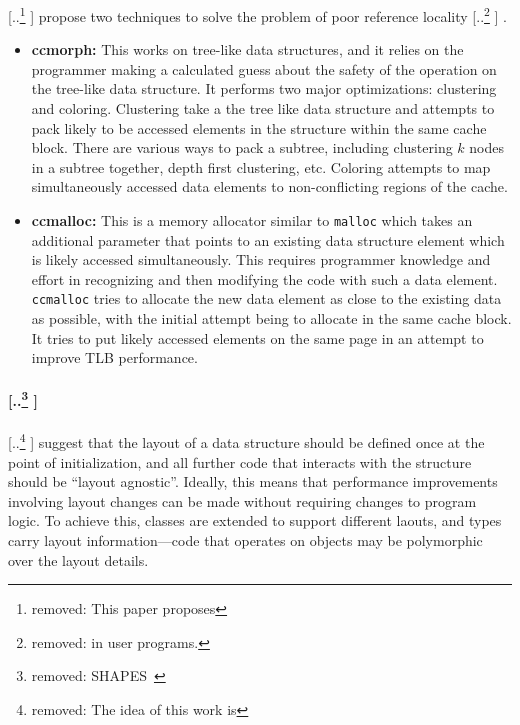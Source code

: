 \documentclass[acmsmall,review,anonymous]{acmart}\settopmatter{printfolios=true,printccs=false,printacmref=false}
\providecommand{\DIFaddtex}[1]{{\protect\color{blue} \sf #1}} %
\providecommand{\DIFdeltex}[1]{{\protect\color{red} [..\footnote{removed: #1} ]}} %
\providecommand{\DIFaddbegin}{} %
\providecommand{\DIFaddend}{} %
\providecommand{\DIFdelbegin}{} %
\providecommand{\DIFdelend}{} %
\providecommand{\DIFadd}[1]{\texorpdfstring{\DIFaddtex{#1}}{#1}} %
\providecommand{\DIFdel}[1]{\texorpdfstring{\DIFdeltex{#1}}{}} %
\newcommand{\DIFscaledelfig}{0.5}
\newlength{\DIFdelgraphicswidth} %
\newlength{\DIFdelgraphicsheight} %
\newcommand{\DIFaddincludegraphics}[2][]{{\color{blue}\fbox{\DIFOincludegraphics[#1]{#2}}}} %
\newcommand{\DIFdelincludegraphics}[2][]{%
\sbox{\DIFdelgraphicsbox}{\DIFOincludegraphics[#1]{#2}}%
\settoboxwidth{\DIFdelgraphicswidth}{\DIFdelgraphicsbox} %
\settoboxtotalheight{\DIFdelgraphicsheight}{\DIFdelgraphicsbox} %
\scalebox{\DIFscaledelfig}{%
\parbox[b]{\DIFdelgraphicswidth}{\usebox{\DIFdelgraphicsbox}\\[-\baselineskip] \rule{\DIFdelgraphicswidth}{0em}}\llap{\resizebox{\DIFdelgraphicswidth}{\DIFdelgraphicsheight}{%
\setlength{\unitlength}{\DIFdelgraphicswidth}%
\begin{picture}(1,1)%
\thicklines\linethickness{2pt} %
{\color[rgb]{1,0,0}\put(0,0){\framebox(1,1){}}}%
{\color[rgb]{1,0,0}\put(0,0){\line( 1,1){1}}}%
{\color[rgb]{1,0,0}\put(0,1){\line(1,-1){1}}}%
\end{picture}%
}\hspace*{3pt}}} %
} %
\DeclareRobustCommand{\DIFaddbegin}{\DIFOaddbegin \let\includegraphics\DIFaddincludegraphics} %
\DeclareRobustCommand{\DIFaddend}{\DIFOaddend \let\includegraphics\DIFOincludegraphics} %
\DeclareRobustCommand{\DIFdelbegin}{\DIFOdelbegin \let\includegraphics\DIFdelincludegraphics} %
\DeclareRobustCommand{\DIFdelend}{\DIFOaddend \let\includegraphics\DIFOincludegraphics} %
\begin{document}
\DIFdel{This paper proposes }\DIFdelend \DIFaddbegin \DIFadd{\citet{CSL} propose }\DIFaddend two techniques to solve the problem of poor reference locality\DIFdelbegin \DIFdel{in user programs.
}%
\DIFdelend \DIFaddbegin \DIFadd{.
}\begin{itemize}[leftmargin=*]
\DIFaddend \item \textbf{ccmorph:} This works on tree-like data structures, and it relies on the programmer making a calculated guess about the safety of the operation on the tree-like data structure. It performs two major optimizations: clustering and coloring. Clustering take a the tree like data structure and attempts to pack likely to be accessed elements in the structure within the same cache block. There are various ways to pack a subtree, including clustering $k$ nodes in a subtree together, depth first clustering, etc.
Coloring attempts to map simultaneously accessed data elements to non-conflicting regions of the cache.
\item \textbf{ccmalloc:} This is a memory allocator similar to \texttt{malloc} which takes an additional parameter that points to an existing data structure element which is likely accessed simultaneously. This requires programmer knowledge and effort in recognizing and then modifying the code with such a data element. \texttt{ccmalloc} tries to allocate the new data element as close to the existing data as possible, with the initial attempt being to allocate in the same cache block. It tries to put likely accessed elements on the same page in an attempt to improve TLB performance.
\end{itemize}


\DIFdelbegin \paragraph{\DIFdel{SHAPES~\cite{Shapes, Shapes2}}} %
\addtocounter{paragraph}{-1}%
\DIFdel{The idea of this work is }\DIFdelend \DIFaddbegin \DIFadd{\citet{Shapes, Shapes2} suggest
}\DIFaddend that the layout of a data structure should be defined once at the point of initialization, and all further code that interacts with the structure should be ``layout agnostic''. Ideally, this means that performance improvements involving layout changes can be made without requiring changes to program logic. To achieve this, classes are extended to support different laouts, and types carry layout information---code that operates on objects may be polymorphic over the layout details.
\end{document}
